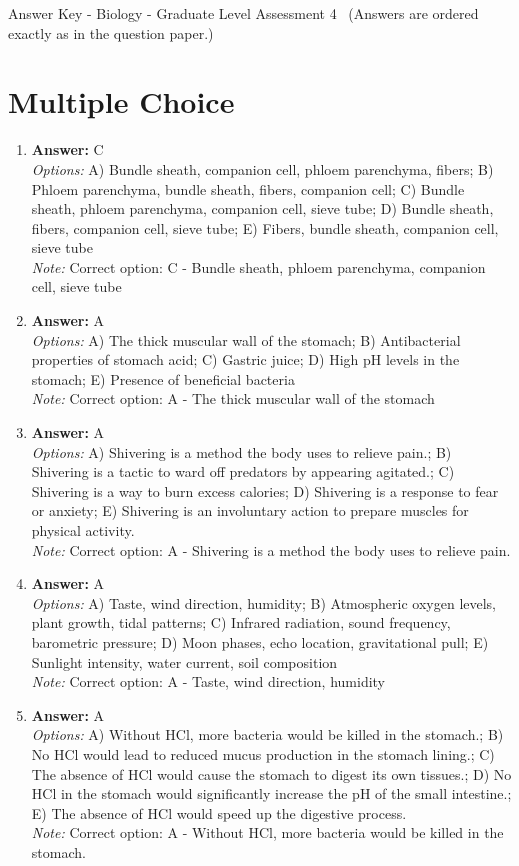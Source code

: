 \documentclass[12pt]{article}
\begin{document}
\begin{center}
Answer Key - Biology - Graduate Level Assessment 4 \
\small (Answers are ordered exactly as in the question paper.)
\end{center}

\section*{Multiple Choice}
\begin{enumerate}[label=\arabic*.]
\item \textbf{Answer:} C
\\ \textit{Options:} A) Bundle sheath, companion cell, phloem parenchyma, fibers; B) Phloem parenchyma, bundle sheath, fibers, companion cell; C) Bundle sheath, phloem parenchyma, companion cell, sieve tube; D) Bundle sheath, fibers, companion cell, sieve tube; E) Fibers, bundle sheath, companion cell, sieve tube
\\ \textit{Note:} Correct option: C - Bundle sheath, phloem parenchyma, companion cell, sieve tube
\item \textbf{Answer:} A
\\ \textit{Options:} A) The thick muscular wall of the stomach; B) Antibacterial properties of stomach acid; C) Gastric juice; D) High pH levels in the stomach; E) Presence of beneficial bacteria
\\ \textit{Note:} Correct option: A - The thick muscular wall of the stomach
\item \textbf{Answer:} A
\\ \textit{Options:} A) Shivering is a method the body uses to relieve pain.; B) Shivering is a tactic to ward off predators by appearing agitated.; C) Shivering is a way to burn excess calories; D) Shivering is a response to fear or anxiety; E) Shivering is an involuntary action to prepare muscles for physical activity.
\\ \textit{Note:} Correct option: A - Shivering is a method the body uses to relieve pain.
\item \textbf{Answer:} A
\\ \textit{Options:} A) Taste, wind direction, humidity; B) Atmospheric oxygen levels, plant growth, tidal patterns; C) Infrared radiation, sound frequency, barometric pressure; D) Moon phases, echo location, gravitational pull; E) Sunlight intensity, water current, soil composition
\\ \textit{Note:} Correct option: A - Taste, wind direction, humidity
\item \textbf{Answer:} A
\\ \textit{Options:} A) Without HCl, more bacteria would be killed in the stomach.; B) No HCl would lead to reduced mucus production in the stomach lining.; C) The absence of HCl would cause the stomach to digest its own tissues.; D) No HCl in the stomach would significantly increase the pH of the small intestine.; E) The absence of HCl would speed up the digestive process.
\\ \textit{Note:} Correct option: A - Without HCl, more bacteria would be killed in the stomach.
\end{enumerate}
\end{document}
